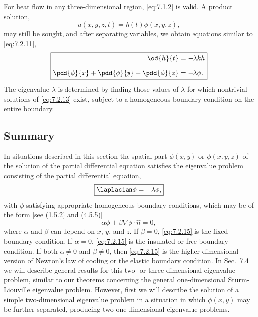 For heat flow in any three-dimensional region, \eqref{eq:7.1.2} is valid.  A product solution,
\begin{equation}
\boxed{u(x,y,z,t) = h(t)\phi(x,y,z),}
\label{eq:7.2.12}
\end{equation}
may still be sought, and after separating variables, we obtain equations similar to \eqref{eq:7.2.11},
\begin{equation}
\boxed{\begin{aligned}
\od{h}{t} &= -\lambda k h \\[6pt]
\pdd{\phi}{x} + \pdd{\phi}{y} + \pdd{\phi}{z} &= -\lambda\phi.
\end{aligned}}
\label{eq:7.2.13}
\end{equation}
The eigenvalue $\lambda$ is determined by finding those values of $\lambda$ for which nontrivial solutions of \eqref{eq:7.2.13} exist, subject to a homogeneous boundary condition on the entire boundary.

\subsection{Summary}
\label{sec:7.2.3}

In situations described in this section the spatial part $\phi(x,y)$ or $\phi(x,y,z)$ of the solution of the partial differential equation satisfies the eigenvalue problem consisting of the partial differential equation,
\begin{equation}
\boxed{\laplacian\phi = -\lambda\phi,}
\label{eq:7.2.14}
\end{equation}
with $\phi$ satisfying appropriate homogeneous boundary conditions, which may be of the form [see (1.5.2) and (4.5.5)]
\begin{equation}
\alpha\phi + \beta\nabla\phi\cdot\hat{n} = 0,
\label{eq:7.2.15}
\end{equation}
where $\alpha$ and $\beta$ can depend on $x$, $y$, and $z$.  If $\beta = 0$, \eqref{eq:7.2.15} is the fixed boundary condition.  If $\alpha = 0$, \eqref{eq:7.2.15} is the insulated or free boundary condition.  If both $\alpha \neq 0$ and $\beta \neq 0$, then \eqref{eq:7.2.15} is the higher-dimensional version of Newton's law of cooling or the elastic boundary condition.  In Sec.~7.4 we will describe general results for this two- or three-dimensional eigenvalue problem, similar to our theorems concerning the general one-dimensional Sturm-Liouville eigenvalue problem.  However, first we will describe the solution of a simple two-dimensional eigenvalue problem in a situation in which $\phi(x,y)$ may be further separated, producing two one-dimensional eigenvalue problems.

